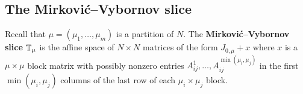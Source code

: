 \documentclass{article} %
\begin{document}
\subsection{The Mirkovi\'c--Vybornov slice}
\label{ss:mvyslice} 
% 
% 
Recall that $\mu=(\mu_1,\dots,\mu_m)$ is a partition of $N$. The \textbf{Mirkovi\'c--Vybornov slice} $\mathbb T_\mu$ is the affine space of $N\times N$ matrices of the form
% 
% 
$J_{0,\mu} + x$ where $x$ is a $\mu\times\mu$ block matrix with possibly nonzero entries $A_{ij}^1,\dots,A_{ij}^{\min(\mu_i,\mu_j)}$ in the first $\min(\mu_i,\mu_j)$ columns of the last row of each $\mu_i\times\mu_j$ block. 
\end{document}
